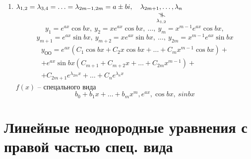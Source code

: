 \begin{note}
\begin{enumerate}
        \item $\lambda_{1,2} = \lambda_{3,4} = \ldots = \lambda_{2m-1,2m} = a\pm bi, \quad \nequalto{\lambda_{2m+1},\ldots,\lambda_n}{\lambda_{1,2}}$
              \[
                  y_1 = e^{ax}\cos bx, \ y_2 = xe^{ax}\cos bx,\ \ldots, \ y_m = x^{m-1}e^{ax}\cos bx,
              \]
              \[
                  y_{m+1} = e^{ax}\sin bx, \ y_{m+2} = xe^{ax}\sin bx, \ \ldots, \ y_{2m} = x^{m-1}e^{ax}\sin bx
              \]
              \begin{multline*}
                  y_{\text{ОО}} = e^{ax}(C_1\cos bx + C_2 x \cos bx + \ldots + C_m x^{m-1}\cos bx) + \\
                  + e^{ax}\sin bx(C_{m+1} + C_{m+2}x + \ldots + C_{2m}x^{m-1}) + \\
                  + C_{2m+1}e^{\lambda_{2m}x} + \ldots + C_ne^{\lambda_n x}
              \end{multline*}
              $f(x)$ -- спецального вида
              \[
                  b_0 + b_1x + \ldots + b_m x^m, e^{ax}, \cos bx, \ sin bx
              \]
    \end{enumerate}
\end{note}

\section{Линейные неоднородные уравнения с правой частью спец. вида}

